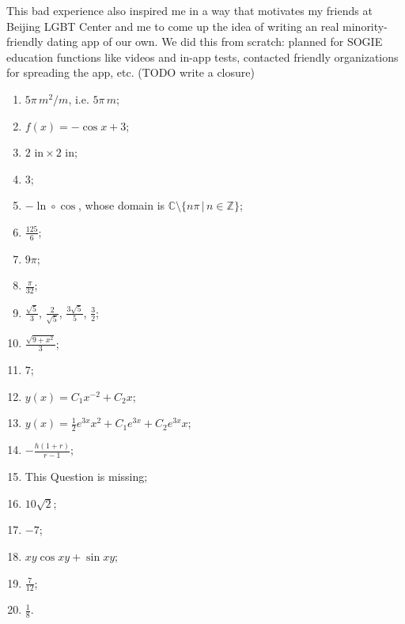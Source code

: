 \documentclass[10pt]{article}
\begin{document}
\begin{CJK*}{UTF8}{gbsn}
This bad experience also inspired me in a way that motivates my friends at Beijing LGBT Center and me to come up the idea of writing an real minority-friendly dating app of our own. We did this from scratch: planned for SOGIE education functions like videos and in-app tests, contacted friendly organizations for spreading the app, etc. (TODO write a closure)

\newpage
\begin{enumerate}[label=\arabic*.]
\item $5\pi\,m^2/m$, i.e. $5\pi\,m$;
\item $f(x)=-\cos x+3$;
\item $2\text{ in}\times 2\text{ in}$;
\item $3$;
\item $-\ln\circ\cos$, whose domain is $\mathbb{C}\setminus\{n\pi\,|\,n\in\mathbb{Z}\}$;
\item $\displaystyle\frac{125}{6}$;
\item $9\pi$;
\item $\displaystyle\frac{\pi}{32}$;
\item $\displaystyle\frac{\sqrt{5}}{3}$, $\displaystyle\frac{2}{\sqrt{5}}$, $\displaystyle\frac{3\sqrt{5}}{5}$, $\displaystyle\frac{3}{2}$;
\item $\displaystyle\frac{\sqrt{9+x^2}}{3}$;
\item $7$;
\item $\displaystyle y(x)=C_1x^{-2}+C_2 x$;
\item $\displaystyle y(x)=\frac{1}{2}e^{3x}x^2+C_1e^{3x}+C_2e^{3x}x$;
\item $\displaystyle-\frac{h(1+r)}{r-1}$;
\item This Question is missing;
\item $10\sqrt{2}$;
\item $-7$;
\item $xy\cos xy+\sin xy$;
\item $\displaystyle\frac{7}{12}$;
\item $\displaystyle\frac{1}{8}$.
\end{enumerate}

\end{CJK*}
\end{document}
